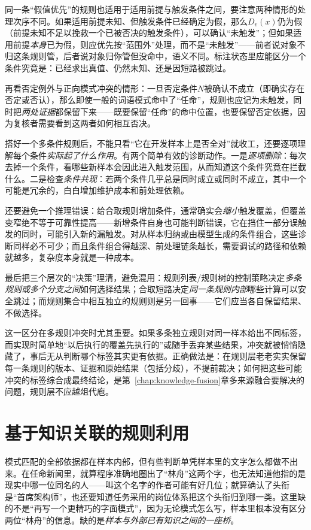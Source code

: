 同一条“假值优先”的规则也适用于适用前提与触发条件之间，要注意两种情形的处理次序不同。如果适用前提未知、但触发条件已经确定为假，那么$D_v(x)$仍为假（前提未知不足以挽救一个已被否决的触发条件），可以确认“未触发”；但如果适用前提\emph{本身}已为假，则应优先按“范围外”处理，而不是“未触发”——前者说对象不归这条规则管，后者说对象归你管但没命中，语义不同。标注状态里应能区分一个条件究竟是：已经求出真值、仍然未知、还是因短路被跳过。

再看否定例外与正向模式冲突的情形：一旦否定条件$N$被确认不成立（即确实存在否定或否认），那么即使一般的词语模式命中了“任命”，规则也应记为未触发，同时把\emph{两处证据}都保留下来——既要保留“任命”的命中位置，也要保留否定依据，因为复核者需要看到这两者如何相互否决。

搭好一个多条件规则后，不能只看“它在开发样本上是否全对”就收工，还要逐项理解每个条件\emph{实际起了什么作用}。有两个简单有效的诊断动作。一是\emph{逐项删除}：每次去掉一个条件，看哪些新样本会因此进入触发范围，从而知道这个条件究竟在拦截什么。二是检查\emph{条件共现}：若两个条件几乎总是同时成立或同时不成立，其中一个可能是冗余的，白白增加维护成本和前处理依赖。

还要避免一个推理错误：给合取规则增加条件，通常确实会\emph{缩小}触发覆盖，但覆盖变窄绝不等于可靠性提高——新增条件自身也可能判断错误，它在挡住一部分误触发的同时，可能引入新的漏触发。对从样本归纳或由模型生成的条件组合，这些诊断同样必不可少；而且条件组合得越深、前处理链条越长，需要调试的路径和依赖就越多，复杂度本身就是一种成本。

最后把三个层次的“决策”理清，避免混用：规则列表/规则树的控制策略决定\emph{多条规则或多个分支之间}如何选择结果；合取短路决定\emph{同一条规则内部}哪些计算可以安全跳过；而规则集合中相互独立的规则则是另一回事——它们应当各自保留结果、不做选择。

这一区分在多规则冲突时尤其重要。如果多条独立规则对同一样本给出不同标签，而实现时简单地“以后执行的覆盖先执行的”或随手丢弃某些结果，冲突就被悄悄隐藏了，事后无从判断哪个标签其实更有依据。正确做法是：在规则层老老实实保留每一条规则的版本、证据和原始结果（包括分歧），不提前裁决；如何把这些可能冲突的标签综合成最终结论，是第~\ref{chap:knowledge-fusion}章多来源融合要解决的问题，规则层不应越俎代庖。

\section{基于知识关联的规则利用}
\label{sec:rule-based-knowledge-acquisition-association}

模式匹配的全部依据都在样本内部，但有些判断单凭样本里的文字怎么都做不出来。在任命新闻里，就算程序准确地圈出了“林舟”这两个字，也无法知道他指的是现实中哪一位同名的人——叫这个名字的作者可能有好几位；就算确认了头衔是“首席架构师”，也还要知道任务采用的岗位体系把这个头衔归到哪一类。这里缺的不是“再写一个更精巧的字面模式”，因为无论模式怎么写，样本里根本没有区分两位“林舟”的信息。缺的是\emph{样本与外部已有知识之间的一座桥}。

